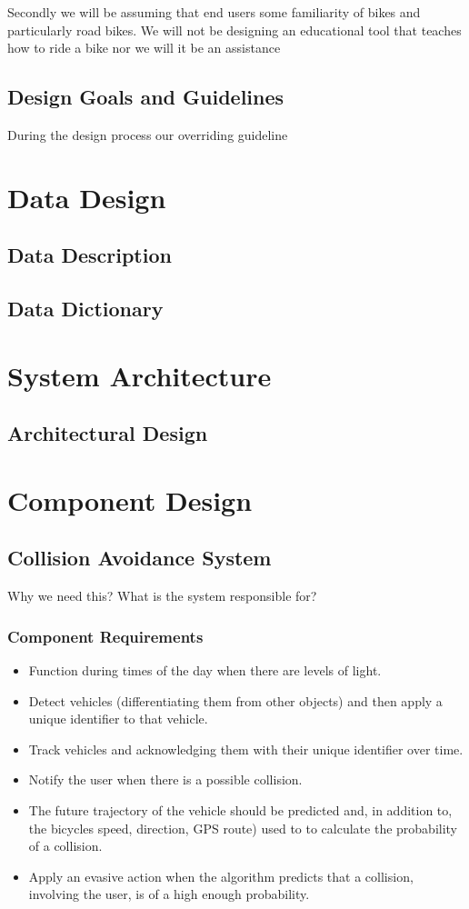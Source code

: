 \documentclass[]{report}
\begin{document}
Secondly we will be assuming that end users some familiarity of bikes and particularly road bikes. We will not be designing an educational tool that teaches how to ride a bike nor we will it be an assistance 
\section{Design Goals and Guidelines}
During the design process our overriding guideline

\chapter{Data Design}
\section{Data Description}
\section{Data Dictionary}

\chapter{System Architecture}
\section{Architectural Design}
\chapter{Component Design}

\section{Collision Avoidance System}

Why we need this? What is the system responsible for?

\subsection{Component Requirements}

\begin{itemize}
  \item Function during times of the day when there are levels of light.
  \item Detect vehicles (differentiating them from other objects) and then apply a unique identifier to that vehicle.
  \item Track vehicles and acknowledging them with their unique identifier over time.
  \item Notify the user when there is a possible collision.
  \item The future trajectory of the vehicle should be predicted and, in addition to, the bicycles speed, direction, GPS route) used to to calculate the probability of a collision.
  \item Apply an evasive action when the algorithm predicts that a collision, involving the user, is of a high enough probability. 
  
\end{itemize}
\end{document}
